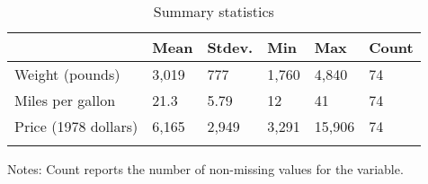 \documentclass{article}
\begin{document}
\begin{table}[tbp] \centering
{}

\caption{Summary statistics}
\label{tab:my_summary_stats}
\begin{tabularx}{\linewidth}{lCCCCC}

\toprule
{}&{Mean}&{Stdev.}&{Min}&{Max}&{Count} \tabularnewline
\midrule \addlinespace[\belowrulesep]
Weight (pounds)&3,019&777&1,760&4,840&74 \tabularnewline
Miles per gallon&21.3&5.79&12&41&74 \tabularnewline
Price (1978 dollars)&6,165&2,949&3,291&15,906&74 \tabularnewline
\bottomrule \addlinespace[\belowrulesep]

\end{tabularx}
\begin{flushleft}
\footnotesize Notes: Count reports the number of non-missing values for the variable.
\end{flushleft}
\end{table}
\end{document}
